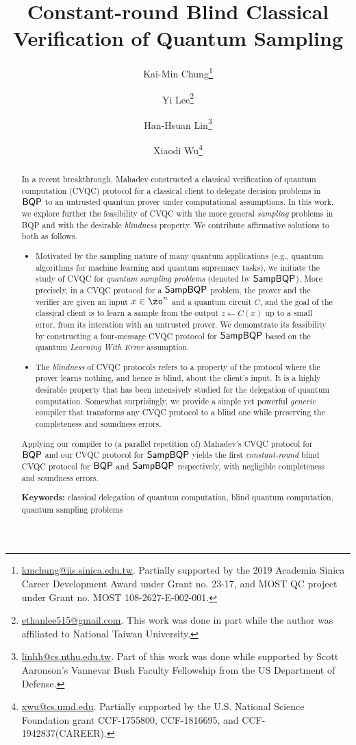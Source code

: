 \documentclass[11pt]{article}
\title{Constant-round Blind Classical Verification of Quantum Sampling}
\author[1]{Kai-Min Chung\thanks{\href{mailto:kmchung@iis.sinica.edu.tw}{kmchung@iis.sinica.edu.tw}. Partially supported by the 2019 Academia Sinica Career Development Award under Grant no. 23-17, and MOST QC project under Grant no. MOST 108-2627-E-002-001.}}
\author[2]{Yi Lee\thanks{\href{mailto:ethanlee515@gmail.com}{ethanlee515@gmail.com}. This work was done in part while the author was affiliated to National Taiwan University.}}
\author[3]{Han-Hsuan Lin\thanks{\href{mailto:linhh@cs.nthu.edu.tw}{linhh@cs.nthu.edu.tw}. Part of this work was done while supported by Scott Aaronson's Vannevar Bush Faculty Fellowship from the US Department of Defense.}}
\author[4]{Xiaodi Wu\thanks{\href{mailto:xwu@cs.umd.edu}{xwu@cs.umd.edu}. Partially supported by the U.S. National Science Foundation grant CCF-1755800, CCF-1816695, and CCF-1942837(CAREER).}}
\affil[1, 2]{Institute of Information Science, Academia Sinica, Taiwan}
\affil[3]{Department of Computer Science, National Tsing Hua University, Taiwan}
\affil[4]{
	Department of Computer Science, Institute for Advanced Computer Studies,
	and Joint Center for Quantum Information and Computer Science,
	University of Maryland, USA
}
\numberwithin{equation}{section}
\newcounter{protocol}
\begin{document}
\maketitle

\begin{abstract}

In a recent breakthrough, Mahadev constructed a classical verification of quantum computation (CVQC) protocol for a  classical client to delegate decision problems in $\operatorname{\mathsf{BQP}}$ to an untrusted quantum prover under computational assumptions. In this work, we explore further the feasibility of CVQC with the more general \emph{sampling} problems in BQP and with the desirable \emph{blindness} property. We contribute affirmative solutions to both as follows. 
\begin{itemize}
\item  Motivated by the sampling nature of many quantum applications (e.g., quantum algorithms for machine learning and quantum supremacy tasks), we initiate the study of  CVQC for \emph{quantum sampling problems} (denoted by $\operatorname{\mathsf{SampBQP}}$).  More precisely, in a CVQC protocol for a $\operatorname{\mathsf{SampBQP}}$ problem, the prover and the verifier are given an input $x\in \zo^n$ and a quantum circuit $C$, and the goal of the classical client is to learn a sample from the output $z \leftarrow C(x)$ up to a small error, from its interation with an untrusted prover. We demonstrate its feasibility by constructing a four-message CVQC protocol for $\operatorname{\mathsf{SampBQP}}$ based on the quantum \emph{Learning With Error} assumption.

\item
The \emph{blindness} of CVQC protocols refers to a property of the protocol where the prover learns nothing, and hence is blind, about the client's input. It is a highly desirable property that has been intensively studied for the delegation of quantum computation. 
Somewhat surprisingly, we provide a simple yet powerful \emph{generic} compiler that transforms any CVQC protocol to a blind one while preserving the completeness and soundness errors.  
\end{itemize}
Applying our compiler to (a parallel repetition of) Mahadev's CVQC protocol for $\operatorname{\mathsf{BQP}}$ and our CVQC protocol for $\operatorname{\mathsf{SampBQP}}$ yields the first \emph{constant-round} blind CVQC protocol for $\operatorname{\mathsf{BQP}}$ and $\operatorname{\mathsf{SampBQP}}$ respectively, with negligible completeness and soundness errors. 

\vspace{1mm}
\noindent \textbf{Keywords:} classical delegation of quantum computation, blind quantum computation, quantum sampling problems


\end{abstract}
\end{document}
